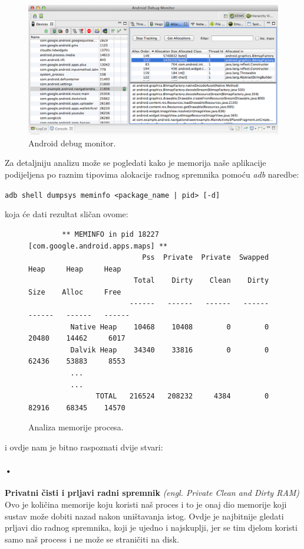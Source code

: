 \documentclass[times, utf8, zavrsni]{fer}
\begin{document}
\begin{figure}[ht!]
\centering
\includegraphics[width=140mm]{img/android-debug-monitor.png}
\caption{Android debug monitor.}
\label{overflow}
\end{figure}

Za detaljniju analizu može se pogledati kako je memorija naše aplikacije podijeljena po raznim tipovima alokacije radnog spremnika pomoću \textit{adb} naredbe:

\begin{center}
\verb=adb shell dumpsys meminfo <package_name | pid> [-d]=
\end{center}
koja će dati rezultat sličan ovome:

\begin{figure}[ht!]
\centering
\begingroup
    \fontsize{9pt}{12pt}\selectfont
		\begin{verbatim}
		** MEMINFO in pid 18227 [com.google.android.apps.maps] **
		                   Pss  Private  Private  Swapped     Heap     Heap     Heap
		                 Total    Dirty    Clean    Dirty     Size    Alloc     Free
		                ------   ------   ------   ------   ------   ------   ------
		  Native Heap    10468    10408        0        0    20480    14462     6017
		  Dalvik Heap    34340    33816        0        0    62436    53883     8553
		  ...
		  ...
		        TOTAL   216524   208232     4384        0    82916    68345    14570
\end{verbatim}
\endgroup
\caption{Analiza memorije procesa.}
\label{overflow}
\end{figure}

\noindent
i ovdje nam je bitno raspoznati dvije stvari:


\paragraph{•}
\textbf{Privatni čisti i prljavi radni spremnik} \textit{(engl. Private Clean and Dirty RAM)}\\
Ovo je količina memorije koju koristi naš proces i to je onaj dio memorije koji sustav može dobiti nazad nakon uništavanja istog. Ovdje je najbitnije gledati prljavi dio radnog spremnika, koji je ujedno i najskuplji, jer se tim djelom koristi samo naš process i ne može se straničiti na disk.
\end{document}
